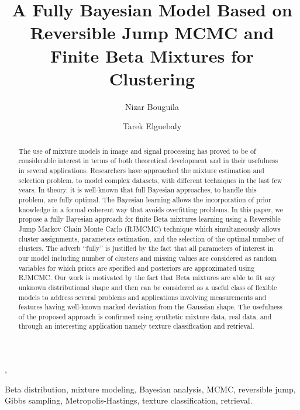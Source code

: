 \documentclass[journal,10pt]{elsart}
\begin{document}
\begin{frontmatter}


\title{A Fully Bayesian Model Based on Reversible Jump MCMC and Finite Beta Mixtures for Clustering}


\author{Nizar Bouguila } , \author{Tarek Elguebaly}
\address{Concordia Institute for Information Systems Engineering,
Faculty of Engineering and Computer Science, Concordia University,
Montreal, Qc, Canada H3G 2W1}
\begin{abstract}
The use of mixture models in image and signal processing has proved to be of considerable interest in terms of
both theoretical development and in their usefulness in several applications.
Researchers have approached the mixture estimation and selection problem, to model complex datasets,
with different techniques in the last few years.
In theory, it is well-known that full Bayesian approaches, to handle this problem, are fully optimal.
The Bayesian learning allows the incorporation of prior knowledge in a formal coherent way that avoids overfitting problems.
In this paper, we propose a fully Bayesian approach for finite Beta mixtures learning using
a Reversible Jump Markov Chain Monte Carlo (RJMCMC) technique which simultaneously allows cluster assignments,
parameters estimation, and the selection of the optimal number of clusters.
The adverb ``fully'' is justified by the fact that all parameters of interest in our model
including number of clusters and missing values are considered as random variables for which priors are specified and posteriors
are approximated using RJMCMC. Our work is motivated by the fact that Beta mixtures are able to fit any unknown distributional
shape and then can be considered as a useful class of flexible models to address several problems and applications
involving measurements and features having well-known marked deviation from the Gaussian shape.
The usefulness of the proposed approach is confirmed using synthetic mixture data, real data, and through
an interesting application namely texture classification and retrieval.
\end{abstract}
\begin{keyword}
Beta distribution, mixture modeling, Bayesian analysis, MCMC, reversible jump, Gibbs
sampling, Metropolis-Hastings, texture classification, retrieval.
\end{keyword}
\end{frontmatter}
\end{document}
